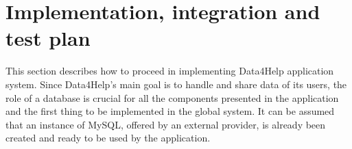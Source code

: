 \documentclass[DD.tex]{subfiles}
\begin{document}
\section{Implementation, integration and test plan}
This section describes how to proceed in implementing Data4Help application system.
Since Data4Help's main goal is to handle and share data of its users, the role of a database is crucial for all the components presented in the application and the first thing to be implemented in the global system. 
It can be assumed that an instance of MySQL, offered by an external provider, is already been created and ready to be used by the application.

\newpage
\end{document}
